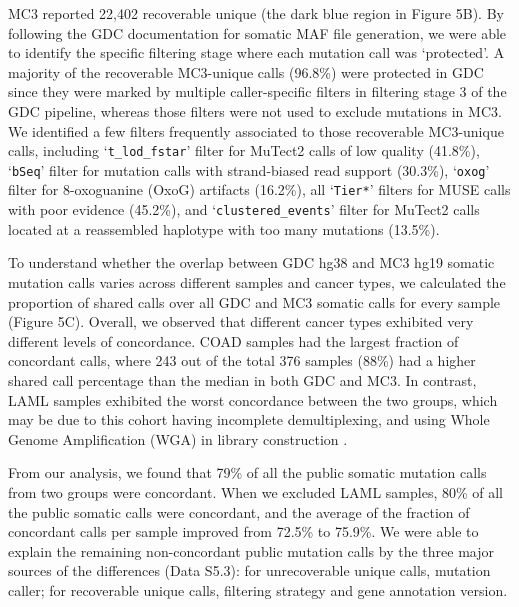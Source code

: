 MC3 reported 22,402 recoverable unique (the dark blue region in Figure 5B). By following the GDC documentation for somatic MAF file generation, we were able to identify the specific filtering stage where each mutation call was `protected'. A majority of the recoverable MC3-unique calls (96.8\%) were protected in GDC since they were marked by multiple caller-specific filters in filtering stage 3 of the GDC pipeline, whereas those filters were not used to exclude mutations in MC3. We identified a few filters frequently associated to those recoverable MC3-unique calls, including `\texttt{t\_lod\_fstar}' filter for MuTect2 calls of low quality (41.8\%), ‘\texttt{bSeq}’ filter for mutation calls with strand-biased read support (30.3\%), `\texttt{oxog}' filter for 8-oxoguanine (OxoG) artifacts (16.2\%), all `\texttt{Tier*}' filters for MUSE calls with poor evidence (45.2\%), and `\texttt{clustered\_events}' filter for MuTect2 calls located at a reassembled haplotype with too many mutations (13.5\%).

To understand whether the overlap between GDC hg38 and MC3 hg19 somatic mutation calls varies across different samples and cancer types, we calculated the proportion of shared calls over all GDC and MC3 somatic calls for every sample (Figure 5C). Overall, we observed that different cancer types exhibited very different levels of concordance. COAD samples had the largest fraction of concordant calls, where 243 out of the total 376 samples (88\%) had a higher shared call percentage than the median in both GDC and MC3. In contrast, LAML samples exhibited the worst concordance between the two groups, which may be due to this cohort having incomplete demultiplexing, and using Whole Genome Amplification (WGA) in library construction \cite{bodinim_rival:HiddenGenomic2015}.

From our analysis, we found that 79\% of all the public somatic mutation calls from two groups were concordant. When we excluded LAML samples, 80\% of all the public somatic calls were concordant, and the average of the fraction of concordant calls per sample improved from 72.5\% to 75.9\%. We were able to explain the remaining non-concordant public mutation calls by the three major sources of the differences (Data S5.3): for unrecoverable unique calls, mutation caller; for recoverable unique calls, filtering strategy and gene annotation version.


